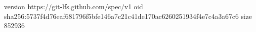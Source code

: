 version https://git-lfs.github.com/spec/v1
oid sha256:5737f4d76eaf681796f5bfe146a7c21c41de170ac6260251934f4e7c4a3a67c6
size 852936
